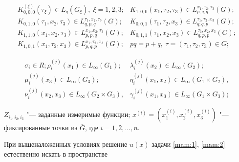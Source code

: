 \[

\begin{array}{ll}

K_{0, 0, 0}^{\left(\xi \right)} \left(\tau _\xi  \right)\in L_{q} \left(G_\xi  \right),\; \xi =1, 2, 3; & K_{1, 0, 0} \left(x_1  ,\tau _2  ,\tau _3  \right)\in L_{p,q,q}^{x_1  ,\tau _2  ,\tau _3  } (G); \\

K_{0, 1, 0} \left(\tau _1  ,x_2  ,\tau _3  \right)\in L_{q,p,q}^{\tau _1  ,x_2  ,\tau _3  } (G); & K_{0, 0, 1} \left(\tau _1  ,\tau _2  ,x_3  \right)\in L_{q,q,p}^{\tau _1 ,\tau _2  ,x_3  } (G); \\

K_{1, 1, 0} \left(x_1 ,x_2  ,\tau _3  \right)\in L_{p,p,q}^{x_1  ,x_2  ,\tau _3  } (G); & K_{0, 1, 1} \left(\tau _1  ,x_2  ,x_3  \right)\in L_{q,p,p}^{\tau _1  ,x_2  ,x_3  } (G);

\\

K_{1, 0, 1} \left(x_1  ,\tau _2  ,x_3  \right)\in L_{p,q,p}^{x_1 ,\tau _2  ,x_3  } (G); & pq=p+q, \; \tau =\left(\tau _1  ,\tau _2  ,\tau _3  \right)\in G;

\end{array}

\]

\[

\begin{array}{ll}

\sigma _{i}\in R;\rho _{i}^{(j) }( x_1) \in L_{\infty }(G_1) ; & \lambda _{i}^{(j) }( x_2) \in L_{\infty }( G_2 ) ;

\\

\mu _{i}^{(j) }( x_3) \in L_{\infty }(G_3 ) ; & \eta _{i}^{(j) }( x_1 ,x_2 ) \in L_{\infty }( G_1 \times G_2 ) ,

\\

\nu _{i}^{(j) }( x_2 ,x_3 ) \in L_{\infty }(G_2 \times G_3 ) , & \gamma _{i}^{(j) }(x_1 ,x_3 ) \in L_{\infty }( G_1 \times G_3 ) ;

\end{array}

\]

$Z_{i_1  ,i_2  ,i_3  }$ "--- заданные измеримые функции; $x^{(i)} =(x_1 ^{(i)} ,x_2 ^{(i)} ,x_3 ^{(i)} )$ "--- фиксированные точки из $\overline{G}$, где $i=1, 2, \dots, n$.



При вышеналоженных условиях решение $u(x)$ задачи \eqref{mam:1}, \eqref{mam:2} естественно искать в пространстве

